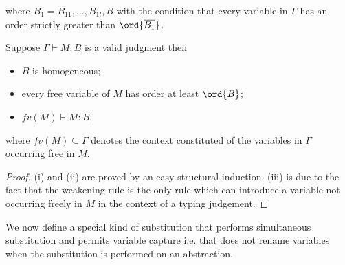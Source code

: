 where $\overline{B_1} = B_{11}, \ldots, B_{1l},\overline{B}$ with
the condition that every variable in $\Gamma$ has an order strictly greater
than $\ord{\overline{B_1}}$.






\begin{property}
\label{proper:safe_basic_prop} Suppose $\Gamma \vdash M : B$ is a
valid judgment then
\begin{itemize}
\item[(i)] $B$ is homogeneous;
\item[(ii)] every free variable of $M$ has order at least $\ord{B}$;
\item[(iii)] $fv(M) \vdash M : B$,
\end{itemize}
where $fv(M) \subseteq \Gamma$ denotes the context constituted of the variables
in $\Gamma$ occurring free in $M$.
\end{property}
\begin{proof}
(i) and (ii) are proved by an easy structural induction. (iii) is
due to the fact that the weakening rule is the only rule which can
introduce a variable not occurring freely in $M$ in the context of a
typing judgement.
\end{proof}

We now define a special kind of substitution that performs
simultaneous substitution and permits variable capture i.e. that
does not rename variables when the substitution is performed on an
abstraction.

